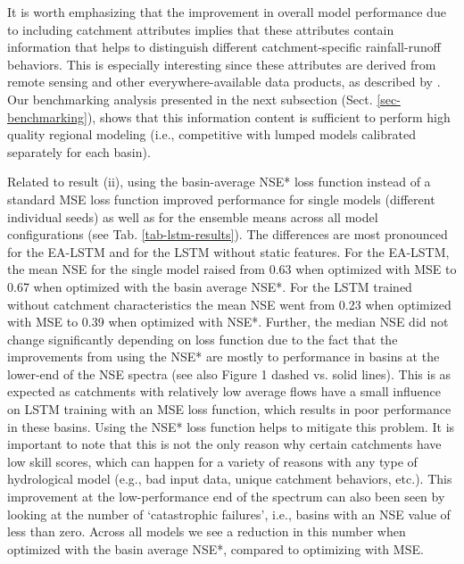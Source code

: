It is worth emphasizing that the improvement in overall model performance due to including catchment attributes implies that these attributes contain information that helps to distinguish different catchment-specific rainfall-runoff behaviors. This is especially interesting since these attributes are derived from remote sensing and other everywhere-available data products, as described by \cite{addor2017large}. Our benchmarking analysis presented in the next subsection (Sect. \ref{sec-benchmarking}), shows that this information content is sufficient to perform high quality regional modeling (i.e., competitive with lumped models calibrated separately for each basin).

Related to result (ii), using the basin-average \gls{NSE*} loss function instead of a standard \gls{MSE} loss function improved performance for single models (different individual seeds) as well as for the ensemble means across all model configurations (see Tab. \ref{tab-lstm-results}). 
The differences are most pronounced for the \gls{EA-LSTM} and for the \gls{LSTM} without static features. For the \gls{EA-LSTM}, the mean \gls{NSE} for the single model raised from 0.63 when optimized with \gls{MSE} to 0.67 when optimized with the basin average \gls{NSE*}. 
For the \gls{LSTM} trained without catchment characteristics the mean \gls{NSE} went from 0.23 when optimized with \gls{MSE} to 0.39 when optimized with \gls{NSE*}. 
Further, the median \gls{NSE} did not change significantly depending on loss function due to the fact that the improvements from using the \gls{NSE*} are mostly to performance in basins at the lower-end of the \gls{NSE} spectra (see also Figure 1 dashed vs. solid lines). This is as expected as catchments with relatively low average flows have a small influence on \gls{LSTM} training with an MSE loss function, which results in poor performance in these basins. Using the \gls{NSE*} loss function helps to mitigate this problem. It is important to note that this is not the only reason why certain catchments have low skill scores, which can happen for a variety of reasons with any type of hydrological model (e.g., bad input data, unique catchment behaviors, etc.). This improvement at the low-performance end of the spectrum can also been seen by looking at the number of ‘catastrophic failures’, i.e., basins with an \gls{NSE} value of less than zero. Across all models we see a reduction in this number when optimized with the basin average \gls{NSE*}, compared to optimizing with \gls{MSE}.

